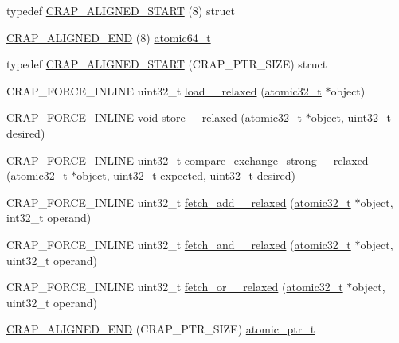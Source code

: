 \begin{DoxyCompactItemize}
typedef \hyperlink{namespacecrap_a35a4179ff2d8be49b4b8fd4d9c8cd214}{C\+R\+A\+P\+\_\+\+A\+L\+I\+G\+N\+E\+D\+\_\+\+S\+T\+A\+R\+T} (8) struct
\item 
\hyperlink{namespacecrap_a50430530738a8b5e14eb5cf710bab3d7}{C\+R\+A\+P\+\_\+\+A\+L\+I\+G\+N\+E\+D\+\_\+\+E\+N\+D} (8) \hyperlink{structcrap_1_1atomic64__t}{atomic64\+\_\+t}
\item 
typedef \hyperlink{namespacecrap_a184e33bb76ffda80cf31d0d82d0ac126}{C\+R\+A\+P\+\_\+\+A\+L\+I\+G\+N\+E\+D\+\_\+\+S\+T\+A\+R\+T} (C\+R\+A\+P\+\_\+\+P\+T\+R\+\_\+\+S\+I\+Z\+E) struct
\item 
C\+R\+A\+P\+\_\+\+F\+O\+R\+C\+E\+\_\+\+I\+N\+L\+I\+N\+E uint32\+\_\+t \hyperlink{namespacecrap_a52611b7c31e450c50c5afa9debc2c0e7}{load\+\_\+\_\+relaxed} (\hyperlink{structcrap_1_1atomic32__t}{atomic32\+\_\+t} $\ast$object)
\item 
C\+R\+A\+P\+\_\+\+F\+O\+R\+C\+E\+\_\+\+I\+N\+L\+I\+N\+E void \hyperlink{namespacecrap_abdf1a4e0b894938d55bc854bc207d039}{store\+\_\+\_\+relaxed} (\hyperlink{structcrap_1_1atomic32__t}{atomic32\+\_\+t} $\ast$object, uint32\+\_\+t desired)
\item 
C\+R\+A\+P\+\_\+\+F\+O\+R\+C\+E\+\_\+\+I\+N\+L\+I\+N\+E uint32\+\_\+t \hyperlink{namespacecrap_a8010c6cfcff3229a2aa4511002d9c672}{compare\+\_\+exchange\+\_\+strong\+\_\+\_\+relaxed} (\hyperlink{structcrap_1_1atomic32__t}{atomic32\+\_\+t} $\ast$object, uint32\+\_\+t expected, uint32\+\_\+t desired)
\item 
C\+R\+A\+P\+\_\+\+F\+O\+R\+C\+E\+\_\+\+I\+N\+L\+I\+N\+E uint32\+\_\+t \hyperlink{namespacecrap_a2dd42a305bc39919d5915ac0d398c4bb}{fetch\+\_\+add\+\_\+\_\+relaxed} (\hyperlink{structcrap_1_1atomic32__t}{atomic32\+\_\+t} $\ast$object, int32\+\_\+t operand)
\item 
C\+R\+A\+P\+\_\+\+F\+O\+R\+C\+E\+\_\+\+I\+N\+L\+I\+N\+E uint32\+\_\+t \hyperlink{namespacecrap_a63b98efafd219a067ccc4bfba4781f72}{fetch\+\_\+and\+\_\+\_\+relaxed} (\hyperlink{structcrap_1_1atomic32__t}{atomic32\+\_\+t} $\ast$object, uint32\+\_\+t operand)
\item 
C\+R\+A\+P\+\_\+\+F\+O\+R\+C\+E\+\_\+\+I\+N\+L\+I\+N\+E uint32\+\_\+t \hyperlink{namespacecrap_a0fd9d33eff0a47c045195ce30be2a59b}{fetch\+\_\+or\+\_\+\_\+relaxed} (\hyperlink{structcrap_1_1atomic32__t}{atomic32\+\_\+t} $\ast$object, uint32\+\_\+t operand)
\item 
\hyperlink{namespacecrap_a6acc358362a824e62491747f7a0b2d81}{C\+R\+A\+P\+\_\+\+A\+L\+I\+G\+N\+E\+D\+\_\+\+E\+N\+D} (C\+R\+A\+P\+\_\+\+P\+T\+R\+\_\+\+S\+I\+Z\+E) \hyperlink{structcrap_1_1atomic__ptr__t}{atomic\+\_\+ptr\+\_\+t}

\end{DoxyCompactItemize}
